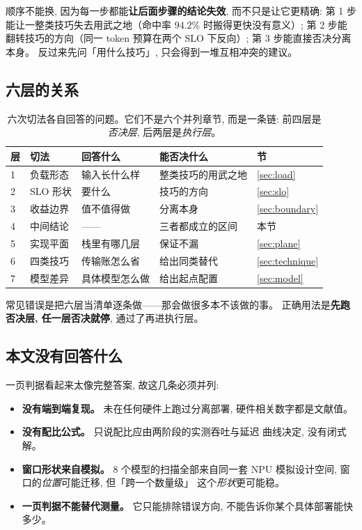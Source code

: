 \noindent 顺序不能换, 因为每一步都能\textbf{让后面步骤的结论失效},
而不只是让它更精确: 第 1 步能让一整类技巧失去用武之地（命中率
$94.2\%$ 时搬得更快没有意义）; 第 2 步能翻转技巧的方向（同一 token
预算在两个 SLO 下反向）; 第 3 步能直接否决分离本身。
反过来先问「用什么技巧」, 只会得到一堆互相冲突的建议。

\subsection{六层的关系}

\begin{table}[t]
\centering
\caption{六次切法各自回答的问题。它们不是六个并列章节, 而是一条链:
前四层是\emph{否决层}, 后两层是\emph{执行层}。}
\label{tab:layers}
\small
\setlength{\tabcolsep}{7pt}
\begin{tabular}{@{}p{0.75cm}p{2.99cm}p{5.08cm}p{4.33cm}p{1.79cm}@{}}
\toprule
层 & 切法 & 回答什么 & 能否决什么 & 节 \\
\midrule
1 & 负载形态 & 输入长什么样 & 整类技巧的用武之地 & \ref{sec:load} \\
2 & SLO 形状 & 要什么 & 技巧的方向 & \ref{sec:slo} \\
3 & 收益边界 & 值不值得做 & 分离本身 & \ref{sec:boundary} \\
4 & 中间结论 & —— & 三者都成立的区间 & 本节 \\
5 & 实现平面 & 栈里有哪几层 & 保证不漏 & \ref{sec:plane} \\
6 & 四类技巧 & 传输账怎么省 & 给出同类替代 & \ref{sec:technique} \\
7 & 模型差异 & 具体模型怎么做 & 给出起点配置 & \ref{sec:model} \\
\bottomrule
\end{tabular}
\end{table}

\noindent 常见错误是把六层当清单逐条做——那会做很多本不该做的事。
正确用法是\textbf{先跑否决层, 任一层否决就停}, 通过了再进执行层。

\subsection{本文没有回答什么}

一页判据看起来太像完整答案, 故这几条必须并列:

\begin{itemize}[leftmargin=1.3em,itemsep=1pt,topsep=2pt]
  \item \textbf{没有端到端复现。} 未在任何硬件上跑过分离部署,
        硬件相关数字都是文献值。
  \item \textbf{没有配比公式。} 只说配比应由两阶段的实测吞吐与延迟
        曲线决定, 没有闭式解。
  \item \textbf{窗口形状来自模拟。} 8 个模型的扫描全部来自同一套 NPU
        模拟设计空间, 窗口的\emph{位置}可能迁移, 但「跨一个数量级」
        这个\emph{形状}更可能稳。
  \item \textbf{一页判据不能替代测量。} 它只能排除错误方向,
        不能告诉你某个具体部署能快多少。
\end{itemize}

